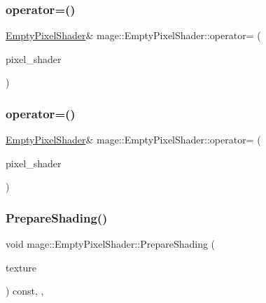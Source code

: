 \subsubsection{\texorpdfstring{operator=()}{operator=()}\hspace{0.1cm}{\footnotesize\ttfamily [1/2]}}
{\footnotesize\ttfamily \hyperlink{classmage_1_1_empty_pixel_shader}{Empty\+Pixel\+Shader}\& mage\+::\+Empty\+Pixel\+Shader\+::operator= (\begin{DoxyParamCaption}\item[{const \hyperlink{classmage_1_1_empty_pixel_shader}{Empty\+Pixel\+Shader} \&}]{pixel\+\_\+shader }\end{DoxyParamCaption})\hspace{0.3cm}{\ttfamily [delete]}}

\hypertarget{classmage_1_1_empty_pixel_shader_a5eee18735b5bc109ca63a913fa8e374d}{}\label{classmage_1_1_empty_pixel_shader_a5eee18735b5bc109ca63a913fa8e374d} 
\subsubsection{\texorpdfstring{operator=()}{operator=()}\hspace{0.1cm}{\footnotesize\ttfamily [2/2]}}
{\footnotesize\ttfamily \hyperlink{classmage_1_1_empty_pixel_shader}{Empty\+Pixel\+Shader}\& mage\+::\+Empty\+Pixel\+Shader\+::operator= (\begin{DoxyParamCaption}\item[{\hyperlink{classmage_1_1_empty_pixel_shader}{Empty\+Pixel\+Shader} \&\&}]{pixel\+\_\+shader }\end{DoxyParamCaption})\hspace{0.3cm}{\ttfamily [delete]}}

\hypertarget{classmage_1_1_empty_pixel_shader_aaaf0ea35ab2459d66593212065a86c1b}{}\label{classmage_1_1_empty_pixel_shader_aaaf0ea35ab2459d66593212065a86c1b} 
\subsubsection{\texorpdfstring{Prepare\+Shading()}{PrepareShading()}\hspace{0.1cm}{\footnotesize\ttfamily [1/2]}}
{\footnotesize\ttfamily void mage\+::\+Empty\+Pixel\+Shader\+::\+Prepare\+Shading (\begin{DoxyParamCaption}\item[{I\+D3\+D11\+Shader\+Resource\+View $\ast$}]{texture }\end{DoxyParamCaption}) const\hspace{0.3cm}{\ttfamily [final]}, {\ttfamily [override]}, {\ttfamily [virtual]}}



